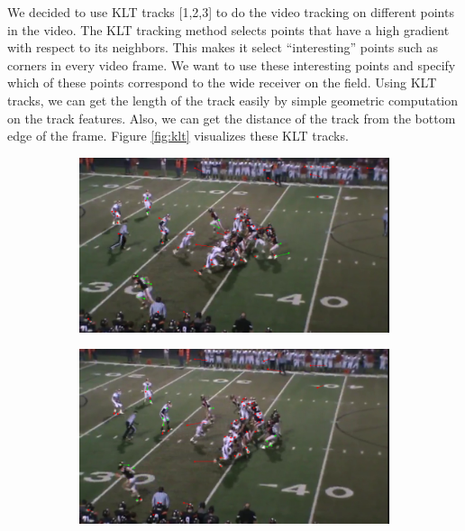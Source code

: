 \documentclass{article} %
\begin{document}
We decided to use KLT tracks [1,2,3] to do the video tracking on different points in the video. The KLT tracking method selects points that have a high gradient with respect to its neighbors. This makes it select ``interesting'' points such as corners in every video frame. We want to use these interesting points and specify which of these points correspond to the wide receiver on the field. Using KLT tracks, we can get the length of the track easily by simple geometric computation on the track features. Also, we can get the distance of the track from the bottom edge of the frame. Figure \ref{fig:klt} visualizes these KLT tracks.

\begin{figure}
\centering
 \begin{subfigure}{.32\textwidth}
  \centering
  \includegraphics[width=1\linewidth]{img/127.png}
 \end{subfigure}\hspace{.5em}%
 \begin{subfigure}{.32\textwidth}
  \centering
  \includegraphics[width=1\linewidth]{img/132.png}
 \end{subfigure}\hspace{.5em}%

\end{figure}
\end{document}
